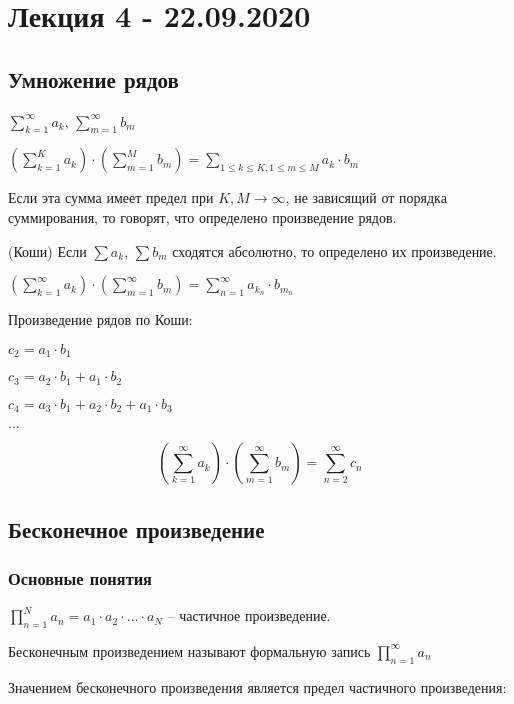 \section{Лекция 4 - 22.09.2020}

\subsection{Умножение рядов}

$\sum_{k=1}^{\infty} a_k$, $\sum_{m=1}^{\infty} b_m$

$\left(\sum_{k=1}^{K} a_k\right) \cdot \left(\sum_{m=1}^{M} b_m \right) = \sum_{1 \leq k \leq K, 1 \leq m \leq M} a_k \cdot b_m$

Если эта сумма имеет предел при $K, M \to \infty$, не зависящий от порядка суммирования, то говорят, что определено произведение рядов.

\begin{theorem}
(Коши) Если $\sum a_k$, $\sum b_m$ сходятся абсолютно, то определено их произведение.

$\left(\sum_{k=1}^{\infty} a_k\right) \cdot \left(\sum_{m=1}^{\infty} b_m \right) = \sum_{n=1}^{\infty} a_{k_n} \cdot b_{m_n}$
\end{theorem}

Произведение рядов по Коши:

$c_2 = a_1 \cdot b_1$

$c_3 = a_2 \cdot b_1 + a_1 \cdot b_2$

$c_4 = a_3 \cdot b_1 + a_2 \cdot b_2 + a_1 \cdot b_3$

$\dots$

$$\left(\sum_{k=1}^{\infty} a_k\right) \cdot \left(\sum_{m=1}^{\infty} b_m \right) = \sum_{n=2}^{\infty} c_n$$

\subsection{Бесконечное произведение}

\subsubsection{Основные понятия}

$\prod_{n=1}^{N} a_n = a_1 \cdot a_2 \cdot \dots \cdot a_N$ -- частичное произведение.

Бесконечным произведением называют формальную запись $\prod_{n=1}^{\infty} a_n$

Значением бесконечного произведения является предел частичного произведения:

